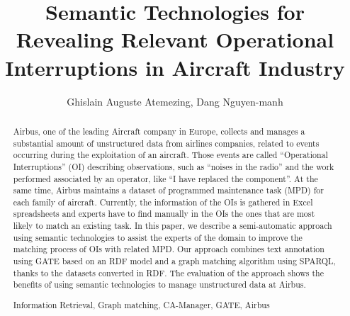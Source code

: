 \documentclass[runningheads,a4paper]{llncs}
\newcommand{\keywords}[1]{\par\addvspace\baselineskip
\noindent\keywordname\enspace\ignorespaces#1}
\begin{document}
\title{Semantic Technologies for Revealing Relevant Operational Interruptions in
Aircraft Industry}

\author{ Ghislain Auguste Atemezing, Dang Nguyen-manh }

  




\maketitle


\begin{abstract}

Airbus, one of the leading Aircraft company in Europe, collects and manages  a substantial amount of unstructured data from airlines companies, related to events occurring during the exploitation of an aircraft. Those events are called ``Operational Interruptions'' (OI) describing observations, such as ``noises in the radio'' and the work performed associated by an operator, like ``I have replaced the component''. At the same time, Airbus maintains a dataset of programmed maintenance task (MPD) for each family of aircraft.  Currently, the information of the OIs is gathered in Excel spreadsheets and experts have to find manually in the OIs the ones that are most likely to match an existing task. In this paper, we describe a semi-automatic approach using semantic technologies to assist the experts of the domain to improve the matching process of OIs with related MPD. Our approach combines text annotation using GATE based on an RDF model and a graph matching algorithm using SPARQL, thanks to the datasets converted in RDF. The evaluation of the approach shows the benefits of using semantic technologies to manage unstructured data at Airbus.    

\keywords{Information Retrieval, Graph matching, CA-Manager, GATE, Airbus}
\end{abstract}
\end{document}
